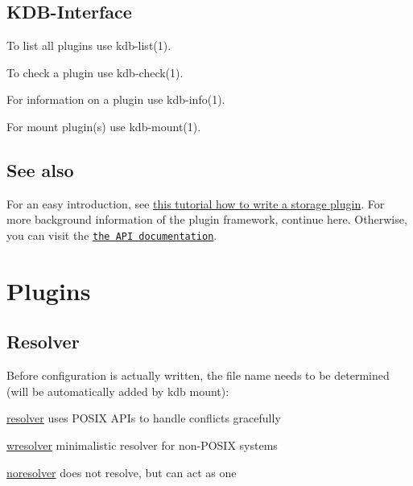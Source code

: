 \subsection*{K\+D\+B-\/\+Interface}


\begin{DoxyItemize}
\item To list all plugins use kdb-\/list(1).
\item To check a plugin use kdb-\/check(1).
\item For information on a plugin use kdb-\/info(1).
\item For mount plugin(s) use kdb-\/mount(1).
\end{DoxyItemize}

\subsection*{See also}

For an easy introduction, see \hyperlink{doc_tutorials_plugins_md}{this tutorial how to write a storage plugin}. For more background information of the plugin framework, continue here. Otherwise, you can visit the \href{http://doc.libelektra.org/api/current/html/group__plugin.html}{\tt the A\+P\+I documentation}.

\section*{Plugins}

\subsection*{Resolver}

Before configuration is actually written, the file name needs to be determined (will be automatically added by kdb mount)\+:


\begin{DoxyItemize}
\item \hyperlink{md_src_plugins_resolver_README_src_plugins_resolver_README_md}{resolver} uses P\+O\+S\+I\+X A\+P\+Is to handle conflicts gracefully
\item \hyperlink{md_src_plugins_wresolver_README_src_plugins_wresolver_README_md}{wresolver} minimalistic resolver for non-\/\+P\+O\+S\+I\+X systems
\item \hyperlink{src_plugins_noresolver_README_md}{noresolver} does not resolve, but can act as one
\end{DoxyItemize}

